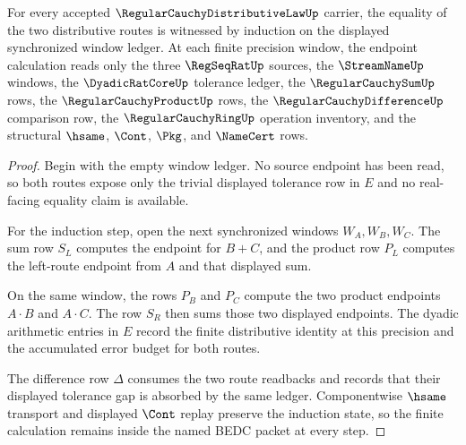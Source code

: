 \begin{theorem}
\label{thm:regular-cauchy-distributive-law-window-induction}
For every accepted $\RegularCauchyDistributiveLawUp$ carrier, the equality of the two distributive routes is witnessed by induction on the displayed synchronized window ledger. At each finite precision window, the endpoint calculation reads only the three $\RegSeqRatUp$ sources, the $\StreamNameUp$ windows, the $\DyadicRatCoreUp$ tolerance ledger, the $\RegularCauchySumUp$ rows, the $\RegularCauchyProductUp$ rows, the $\RegularCauchyDifferenceUp$ comparison row, the $\RegularCauchyRingUp$ operation inventory, and the structural $\hsame$, $\Cont$, $\Pkg$, and $\NameCert$ rows.
\end{theorem}
\begin{proof}
Begin with the empty window ledger. No source endpoint has been read, so both routes expose only the trivial displayed tolerance row in $E$ and no real-facing equality claim is available.

For the induction step, open the next synchronized windows $W_A,W_B,W_C$. The sum row $S_L$ computes the endpoint for $B+C$, and the product row $P_L$ computes the left-route endpoint from $A$ and that displayed sum.

On the same window, the rows $P_B$ and $P_C$ compute the two product endpoints $A\cdot B$ and $A\cdot C$. The row $S_R$ then sums those two displayed endpoints. The dyadic arithmetic entries in $E$ record the finite distributive identity at this precision and the accumulated error budget for both routes.

The difference row $\Delta$ consumes the two route readbacks and records that their displayed tolerance gap is absorbed by the same ledger. Componentwise $\hsame$ transport and displayed $\Cont$ replay preserve the induction state, so the finite calculation remains inside the named BEDC packet at every step.
\end{proof}

